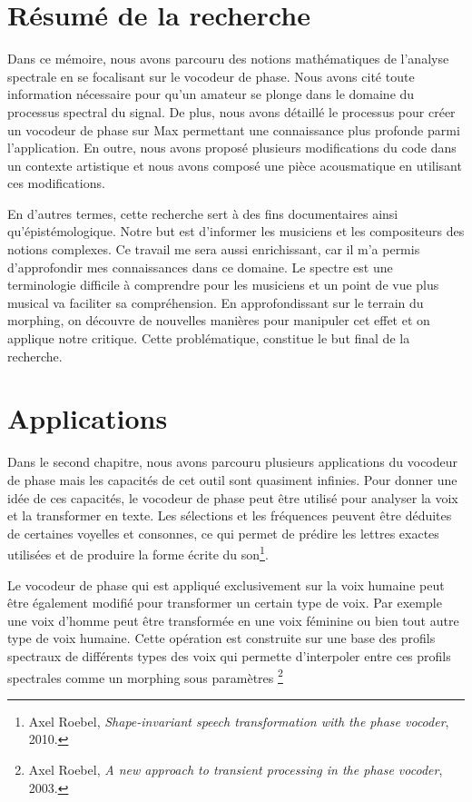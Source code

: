 \label{ch:conclusions}

\section{Résumé de la recherche}

Dans ce mémoire, nous avons parcouru des notions mathématiques de l'analyse spectrale en se focalisant sur le vocodeur de phase. Nous avons cité toute information nécessaire pour qu'un amateur se plonge dans le domaine du processus spectral du signal. De plus, nous avons détaillé le processus pour créer un vocodeur de phase sur Max permettant une connaissance plus profonde parmi l'application. En outre, nous avons proposé plusieurs modifications du code dans un contexte artistique et nous avons composé une pièce acousmatique en utilisant ces modifications.

En d'autres termes, cette recherche sert à des fins documentaires ainsi qu'épistémologique. Notre but est d'informer les musiciens et les compositeurs des notions complexes. Ce travail me sera aussi enrichissant, car il m'a permis d'approfondir mes connaissances dans ce domaine. Le spectre est une terminologie difficile à comprendre pour les musiciens et un point de vue plus musical va faciliter sa compréhension. En approfondissant sur le terrain du morphing, on découvre de nouvelles manières pour manipuler cet effet et on applique notre critique. Cette problématique, constitue le but final de la recherche.

\section{Applications}

Dans le second chapitre, nous avons parcouru plusieurs applications du vocodeur de phase mais les capacités de cet outil sont quasiment infinies. Pour donner une idée de ces capacités, le vocodeur de phase peut être utilisé pour analyser la voix et la transformer en texte. Les sélections et les fréquences peuvent être déduites de certaines voyelles et consonnes, ce qui permet de prédire les lettres exactes utilisées et de produire la forme écrite du son\footnote{Axel Roebel, \textit{Shape-invariant speech transformation with the phase vocoder}, 2010.\nocite{roebel2010shape}}.

Le vocodeur de phase qui est appliqué exclusivement sur la voix humaine peut être également modifié pour transformer un certain type de voix. Par exemple une voix d'homme peut être transformée en une voix féminine ou bien tout autre type de voix humaine. Cette opération est construite sur une base des profils spectraux de différents types des voix qui permette d'interpoler entre ces profils spectrales comme un morphing sous paramètres \footnote{Axel Roebel, \textit{A new approach to transient processing in the phase vocoder}, 2003. \nocite{roebel:hal-01161124}}

